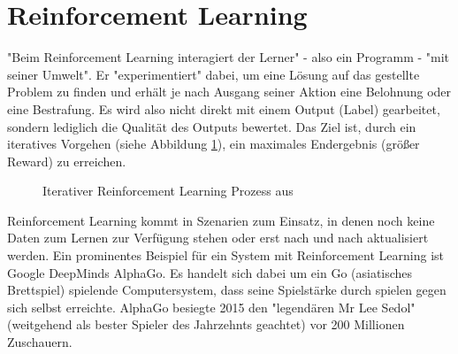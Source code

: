 \section{Reinforcement Learning}\label{sec:rl1}
"Beim Reinforcement Learning interagiert der Lerner" - also ein Programm - "mit seiner Umwelt"\citep[S.~45; eigene Übersetzung]{settles_active_2010}. Er "experimentiert" dabei, um eine Lösung auf das gestellte Problem zu finden und erhält je nach Ausgang seiner Aktion eine Belohnung oder eine Bestrafung.\citep[S.~331]{kubat_introduction_2017} Es wird also nicht direkt mit einem Output (Label) gearbeitet, sondern lediglich die Qualität des Outputs bewertet. Das Ziel ist, durch ein iteratives Vorgehen (siehe Abbildung \ref{fig:reinforcementLearning}), ein maximales Endergebnis (größer Reward) zu erreichen.\citep[S.~69]{swamynathan_mastering_2017}
\begin{figure}[H]
\centering
{}
\caption{Iterativer Reinforcement Learning Prozess aus \citep[S.~25]{lison_introduction_2012}}
\label{fig:reinforcementLearning}
\end{figure}
Reinforcement Learning kommt in Szenarien zum Einsatz, in denen noch keine Daten zum Lernen zur Verfügung stehen oder erst nach und nach aktualisiert werden.\citep[S.~223]{ramasubramanian_machine_2017}\newline
Ein prominentes Beispiel für ein System mit Reinforcement Learning ist Google DeepMinds AlphaGo. Es handelt sich dabei um ein Go (asiatisches Brettspiel) spielende Computersystem, dass seine Spielstärke durch spielen gegen sich selbst erreichte.\citep{silver_mastering_2017} AlphaGo besiegte 2015 den "legendären Mr Lee Sedol" (weitgehend als bester Spieler des Jahrzehnts geachtet) vor 200 Millionen Zuschauern.\citep{deepmind_alphago_2017}

